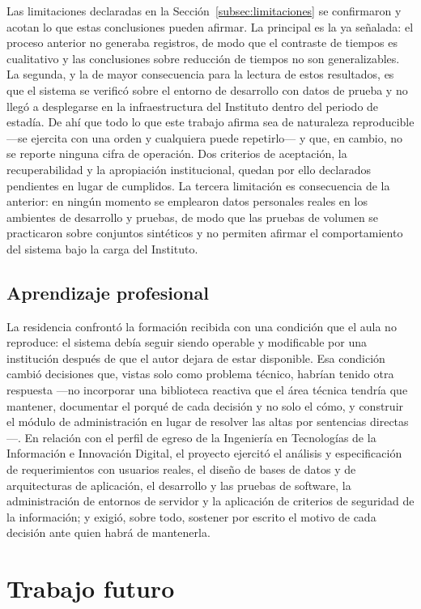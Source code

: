 Las limitaciones declaradas en la Sección~\ref{subsec:limitaciones} se confirmaron y acotan lo que estas conclusiones pueden afirmar. La principal es la ya señalada: el proceso anterior no generaba registros, de modo que el contraste de tiempos es cualitativo y las conclusiones sobre reducción de tiempos no son generalizables. La segunda, y la de mayor consecuencia para la lectura de estos resultados, es que el sistema se verificó sobre el entorno de desarrollo con datos de prueba y no llegó a desplegarse en la infraestructura del Instituto dentro del periodo de estadía. De ahí que todo lo que este trabajo afirma sea de naturaleza reproducible —se ejercita con una orden y cualquiera puede repetirlo— y que, en cambio, no se reporte ninguna cifra de operación. Dos criterios de aceptación, la recuperabilidad y la apropiación institucional, quedan por ello declarados pendientes en lugar de cumplidos. La tercera limitación es consecuencia de la anterior: en ningún momento se emplearon datos personales reales en los ambientes de desarrollo y pruebas, de modo que las pruebas de volumen se practicaron sobre conjuntos sintéticos y no permiten afirmar el comportamiento del sistema bajo la carga del Instituto.

\subsection{Aprendizaje profesional}

La residencia confrontó la formación recibida con una condición que el aula no reproduce: el sistema debía seguir siendo operable y modificable por una institución después de que el autor dejara de estar disponible. Esa condición cambió decisiones que, vistas solo como problema técnico, habrían tenido otra respuesta —no incorporar una biblioteca reactiva que el área técnica tendría que mantener, documentar el porqué de cada decisión y no solo el cómo, y construir el módulo de administración en lugar de resolver las altas por sentencias directas—. En relación con el perfil de egreso de la Ingeniería en Tecnologías de la Información e Innovación Digital, el proyecto ejercitó el análisis y especificación de requerimientos con usuarios reales, el diseño de bases de datos y de arquitecturas de aplicación, el desarrollo y las pruebas de software, la administración de entornos de servidor y la aplicación de criterios de seguridad de la información; y exigió, sobre todo, sostener por escrito el motivo de cada decisión ante quien habrá de mantenerla.

\section{Trabajo futuro} \label{sec:trabajo_futuro} %

